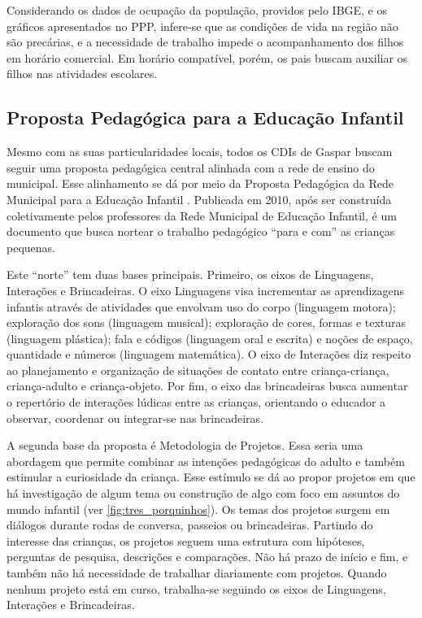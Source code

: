 Considerando os dados de ocupação da população, providos pelo IBGE, e os gráficos apresentados no \ac{PPP}, infere-se que as condições de vida na região não são precárias, e a necessidade de trabalho impede o acompanhamento dos filhos em horário comercial. Em horário compatível, porém, os pais buscam auxiliar os filhos nas atividades escolares.
 
\subsection{Proposta Pedagógica para a Educação Infantil}
Mesmo com as suas particularidades locais, todos os CDIs de Gaspar buscam seguir uma proposta pedagógica central alinhada com a rede de ensino do municipal. Esse alinhamento se dá por meio  da Proposta Pedagógica da Rede Municipal para a Educação Infantil \cite{gaspar_proposta_2010}. Publicada em 2010, após ser construída coletivamente pelos professores da Rede Municipal de Educação Infantil, é um documento que busca nortear o trabalho pedagógico “para e com” as crianças pequenas.
 
Este “norte” tem duas bases principais. Primeiro, os eixos de Linguagens, Interações e Brincadeiras. O eixo Linguagens visa incrementar as aprendizagens infantis através de atividades que envolvam uso do corpo (linguagem motora); exploração dos sons (linguagem musical); exploração de cores, formas e texturas (linguagem plástica); fala e códigos (linguagem oral e escrita) e noções de espaço, quantidade e números (linguagem matemática). O eixo de Interações diz respeito ao planejamento e organização de situações de contato entre criança-criança, criança-adulto e criança-objeto. Por fim, o eixo das brincadeiras busca aumentar o repertório de interações lúdicas entre as crianças, orientando o educador a observar, coordenar ou integrar-se nas brincadeiras.
 
A segunda base da proposta é Metodologia de Projetos. Essa seria uma abordagem que permite combinar as intenções pedagógicas do adulto e também estimular a curiosidade da criança. Esse estímulo se dá ao propor projetos em que há investigação de algum tema ou construção de algo com foco em assuntos do mundo infantil (ver \autoref{fig:tres_porquinhos}). Os temas dos projetos surgem em diálogos durante rodas de conversa, passeios ou brincadeiras. Partindo do interesse das crianças, os projetos seguem uma estrutura com hipóteses, perguntas de pesquisa, descrições e comparações. Não há prazo de início e fim, e também não há necessidade de trabalhar diariamente com projetos. Quando nenhum projeto está em curso, trabalha-se seguindo os eixos de Linguagens, Interações e Brincadeiras.
 
